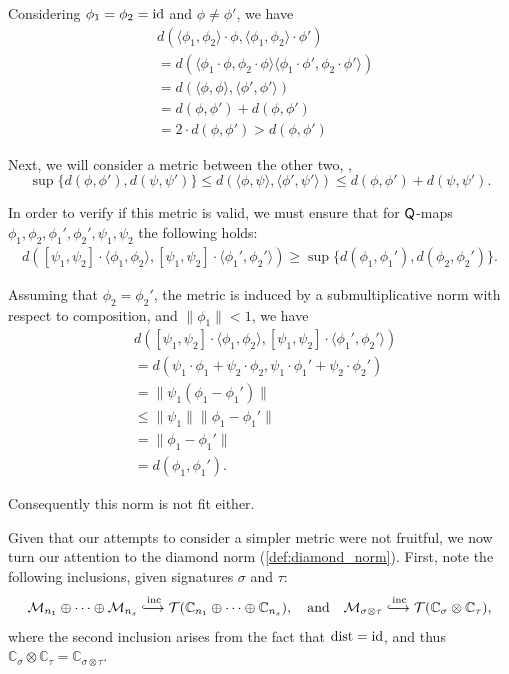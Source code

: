 Considering $\phi_1=\phi_2 = \mathrm{id}$ and $\phi \neq \phi'$, we have
\begin{align*}
  & d( \langle \phi_1, \phi_2 \rangle \cdot \phi, \langle \phi_1, \phi_2 \rangle \cdot \phi' )  \\
  & = d(  \langle \phi_1 \cdot \phi, \phi_2 \cdot \phi \rangle \langle \phi_1 \cdot \phi', \phi_2 \cdot \phi' \rangle ) \\
  & = d(  \langle  \phi, \phi \rangle, \langle  \phi',  \phi' \rangle  )  \\
  & = d(  \phi,  \phi'  ) +  d(  \phi,  \phi'  ) \\
  & = 2 \cdot d(  \phi,  \phi'  ) > d(  \phi,  \phi'  )
\end{align*}

Next, we will consider a metric between the other two, \ie, $$\sup \{ d(\phi, \phi' ), d(\psi, \psi') \} \leq d(\langle \phi, \psi \rangle, \langle \phi', \psi' \rangle ) \leq d(\phi, \phi' ) +  d(\psi, \psi').$$

In order to verify if this metric is valid,  we must ensure that for $\mathsf{Q}$-maps $\phi_1, \phi_2,  \phi_1', \phi_2', \psi_1, \psi_2$ the following holds:
\begin{align*}
  d([\psi_1, \psi_2] \cdot \langle \phi_1, \phi_2 \rangle, [\psi_1, \psi_2] \cdot \langle \phi_1', \phi_2' \rangle ) \geq \sup \{ d(\phi_1, \phi_1' ), d(\phi_2, \phi_2') \}.
\end{align*}

Assuming that \(\phi_2 = \phi_2'\),  the metric is induced by a submultiplicative norm with respect to composition, and \(\|\phi_1\| < 1\), we have
\begin{align*}
  & d([\psi_1, \psi_2] \cdot \langle \phi_1, \phi_2 \rangle, [\psi_1, \psi_2] \cdot \langle \phi_1', \phi_2' \rangle ) \\
  & = d(\psi_1 \cdot \phi_1 + \psi_2 \cdot \phi_2, \psi_1 \cdot \phi_1' + \psi_2 \cdot \phi_2') \\
  & = \lVert \psi_1 (\phi_1- \phi_1' ) \lVert \\
  & \leq    \lVert \psi_1  \lVert  \lVert \phi_1- \phi_1'  \lVert \\
  & = \lVert \phi_1- \phi_1'  \lVert  \\
    & =  d(\phi_1, \phi_1' ).
\end{align*}



Consequently this norm is not fit either.


Given that our attempts to consider a simpler metric were not fruitful, we now turn our attention to the diamond norm (\autoref{def:diamond_norm}). First, note the following inclusions, given signatures $\sigma$ and $\tau$:
\[
\mathcal{M}_{n_1} \oplus \cdots \oplus \mathcal{M}_{n_s} 
\xhookrightarrow{\text{inc}} 
\mathcal{T}(\mathbb{C}_{n_1} \oplus \cdots \oplus \mathbb{C}_{n_s}), 
\quad \text{and} \quad 
\mathcal{M}_{\sigma \otimes \tau} 
\xhookrightarrow{\text{inc}} 
\mathcal{T}(\mathbb{C}_{\sigma} \otimes \mathbb{C}_{\tau}),
\]
where the second inclusion arises from the fact that $\mathrm{dist} = \mathrm{id}$, and thus $\mathbb{C}_{\sigma} \otimes \mathbb{C}_{\tau} = \mathbb{C}_{\sigma \otimes \tau}$.

